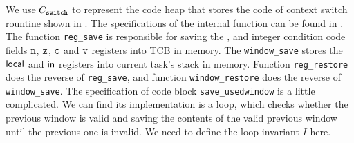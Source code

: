 We use $C_{\texttt{switch}}$ to represent the 
code heap that stores the code of context switch rountine shown 
in \Fig{\ref{fig:Main function of context switch routine}}. 
The specifications of the internal function can be found in 
\Fig{\ref{fig:Specifications of Internal Functions}}. The 
function \texttt{reg\_save} is responsible for saving the 
\localRN{}, \inRN{} and integer condition code fields $\texttt{n}$, 
$\texttt{z}$, $\texttt{c}$ and $\texttt{v}$ registers into TCB in memory. 
The \texttt{window\_save} stores the 
$\textsf{local}$ and $\textsf{in}$ registers into current task's stack in memory. 
Function \texttt{reg\_restore} does the reverse of 
\texttt{reg\_save}, and function \texttt{window\_restore} does the 
reverse of \texttt{window\_save}. The specification of code block 
\texttt{save\_usedwindow} is a little complicated. 
We can find its implementation is a loop, which checks whether the 
previous window is valid and saving the contents of the valid 
previous window until the previous one is invalid. 
We need to define the loop invariant $I$ here. 

